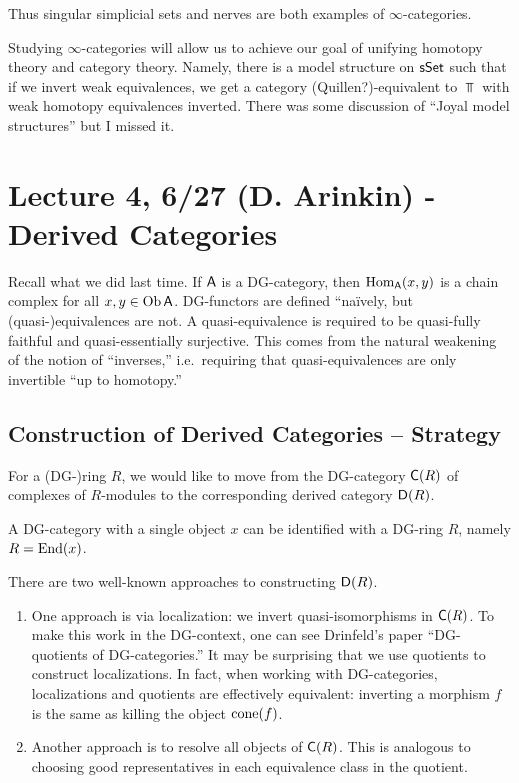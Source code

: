 \documentclass{amsart}
\begin{document}
Thus singular simplicial sets and nerves are both examples of $\infty$-categories.

Studying $\infty$-categories will allow us to achieve our goal of unifying homotopy theory and category theory.
Namely, there is a model structure on $\mathsf{sSet}$ such that if we invert weak equivalences, we get a category (Quillen?)-equivalent to $\Top$ with weak homotopy equivalences inverted.
There was some discussion of ``Joyal model structures'' but I missed it.

\section{Lecture 4, 6/27 (D. Arinkin) - Derived Categories}

Recall what we did last time.
If $\mathsf{A}$ is a DG-category, then $\operatorname{Hom}_{\mathsf{A}}(x, y)$ is a chain complex for all $x, y \in \operatorname{Ob} \mathsf{A}$.
DG-functors are defined ``na\"ively, but (quasi-)equivalences are not.
A quasi-equivalence is required to be quasi-fully faithful and quasi-essentially surjective.
This comes from the natural weakening of the notion of ``inverses,'' i.e.\ requiring that quasi-equivalences are only invertible ``up to homotopy.''

\subsection{Construction of Derived Categories -- Strategy}

For a (DG-)ring $R$, we would like to move from the DG-category $\mathsf{C}(R)$ of complexes of $R$-modules to the corresponding derived category $\mathsf{D}(R)$.

\begin{ex}
	A DG-category with a single object $x$ can be identified with a DG-ring $R$, namely $R = \operatorname{End}(x)$.
\end{ex}

There are two well-known approaches to constructing $\mathsf{D}(R)$.

\begin{enumerate}
	\item One approach is via localization: we invert quasi-isomorphisms in $\mathsf{C}(R)$.
		To make this work in the DG-context, one can see Drinfeld's paper ``DG-quotients of DG-categories.''
		It may be surprising that we use quotients to construct localizations.
		In fact, when working with DG-categories, localizations and quotients are effectively equivalent: inverting a morphism $f$ is the same as killing the object $\operatorname{cone}(f)$.
	\item Another approach is to resolve all objects of $\mathsf{C}(R)$.
		This is analogous to choosing good representatives in each equivalence class in the quotient.
\end{enumerate}
\end{document}
